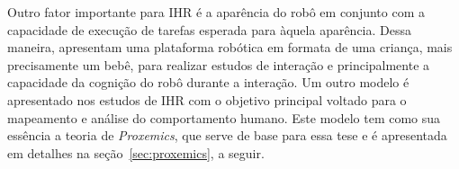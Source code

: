 Outro fator importante para IHR é a aparência do robô em conjunto com a capacidade de execução de tarefas esperada para àquela aparência. Dessa maneira,  apresentam uma plataforma robótica em formata de uma criança, mais precisamente um bebê, para realizar estudos de interação e principalmente a capacidade da cognição do robô durante a interação. Um outro modelo é apresentado nos estudos de IHR com o objetivo principal voltado para o mapeamento e análise do comportamento humano. Este modelo tem como sua essência a teoria de \emph{Proxemics}, que serve de base para essa tese e é apresentada em detalhes na seção~\ref{sec:proxemics}, a seguir.

